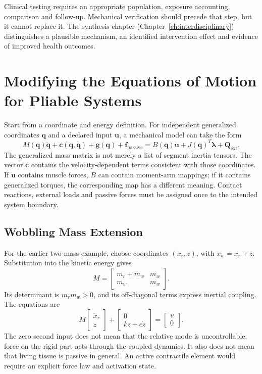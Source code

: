 Clinical testing requires an appropriate population, exposure accounting, comparison and follow-up. Mechanical verification should precede that step, but it cannot replace it. The synthesis chapter (Chapter~\ref{ch:interdisciplinary}) distinguishes a plausible mechanism, an identified intervention effect and evidence of improved health outcomes.

\section{Modifying the Equations of Motion for Pliable Systems}
\label{sec:eom_pliable}
\label{eq:standard_eom}

Start from a coordinate and energy definition. For independent generalized coordinates $\mathbf q$ and a declared input $\mathbf u$, a mechanical model can take the form
\[
M(\mathbf q)\ddot{\mathbf q}
+\mathbf c(\mathbf q,\dot{\mathbf q})
+\mathbf g(\mathbf q)+\mathbf f_{\mathrm{passive}}
=B(\mathbf q)\mathbf u+J(\mathbf q)^T\boldsymbol\lambda+\mathbf Q_{\mathrm{ext}}.
\]
The generalized mass matrix is not merely a list of segment inertia tensors. The vector $\mathbf c$ contains the velocity-dependent terms consistent with those coordinates. If $\mathbf u$ contains muscle forces, $B$ can contain moment-arm mappings; if it contains generalized torques, the corresponding map has a different meaning. Contact reactions, external loads and passive forces must be assigned once to the intended system boundary.

\subsection{Wobbling Mass Extension}

For the earlier two-mass example, choose coordinates $(x_r,z)$, with $x_w=x_r+z$. Substitution into the kinetic energy gives
\[
M=
\begin{bmatrix}
m_r+m_w&m_w\\
m_w&m_w
\end{bmatrix}.
\]
Its determinant is $m_rm_w>0$, and its off-diagonal terms express inertial coupling. The equations are
\[
M\begin{bmatrix}\ddot x_r\\\ddot z\end{bmatrix}
+\begin{bmatrix}0\\kz+c\dot z\end{bmatrix}
=\begin{bmatrix}u\\0\end{bmatrix}.
\]
The zero second input does not mean that the relative mode is uncontrollable; force on the rigid part acts through the coupled dynamics. It also does not mean that living tissue is passive in general. An active contractile element would require an explicit force law and activation state.

